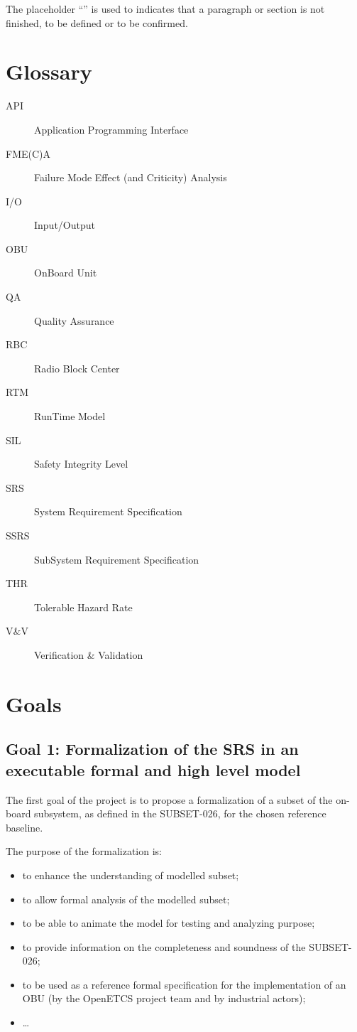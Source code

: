 \documentclass{template/openetcs_article}
\begin{document}
The placeholder “” is used to indicates that a paragraph or section is not finished, 
to be defined or to be confirmed.

\section{Glossary}
\begin{description}
\item[API] Application Programming Interface
\item[FME(C)A] Failure Mode Effect (and Criticity) Analysis
\item[I/O] Input/Output
\item[OBU] OnBoard Unit
\item[QA] Quality Assurance
\item[RBC] Radio Block Center
\item[RTM] RunTime Model
\item[SIL] Safety Integrity Level
\item[SRS] System Requirement Specification
\item[SSRS] SubSystem Requirement Specification
\item[THR] Tolerable Hazard Rate
\item[V\&V] Verification \& Validation
\end{description}

\section{Goals}
\subsection{Goal 1: Formalization of the SRS in an executable formal and high level model}
The first goal of the project is to propose a formalization of a subset of the on-board subsystem,
as defined in the SUBSET-026, for the chosen reference baseline. 

The purpose of the formalization is:
\begin{itemize}
\item to enhance the understanding of modelled subset;
\item to allow formal analysis of the modelled subset;
\item to be able to animate the model for testing and analyzing purpose;
\item to provide information on the completeness and soundness of the SUBSET-026;
\item to be used as a reference formal specification for the implementation of an OBU 
(by the OpenETCS project team and by industrial actors);
\item \dots
\end{itemize}
\end{document}
